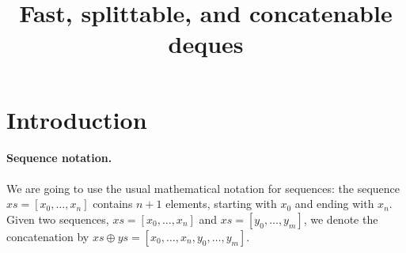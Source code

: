 \documentclass[10pt]{article}
\title{Fast, splittable, and concatenable deques}
\author{}
\begin{document}
\maketitle

\section{Introduction}


\paragraph{Sequence notation.} We are going to use the usual mathematical
notation for sequences: the sequence $xs = [x_0, \ldots, x_n]$
contains $n + 1$ elements, starting with $x_0$ and ending with
$x_n$. Given two sequences, $xs = [x_0, \ldots, x_n]$ and $xs = [y_0,
  \ldots, y_m]$, we denote the concatenation by $xs \oplus ys = [x_0,
  \ldots, x_n, y_0, \ldots, y_m]$.
\end{document}
